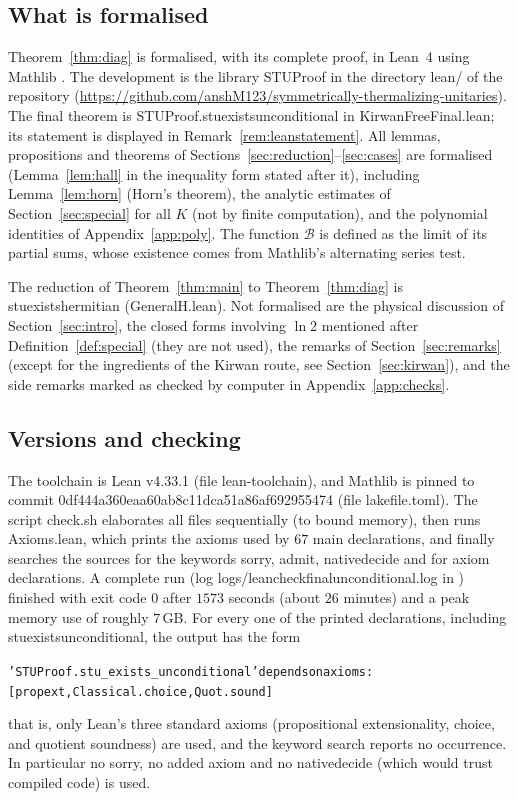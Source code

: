 \documentclass[11pt]{amsart}
\theoremstyle{definition}
\theoremstyle{remark}
\numberwithin{equation}{section}
\newcommand{\cB}{\mathcal{B}}
\newcommand{\leanus}{\textunderscore\allowbreak}
\newcommand{\lean}[1]{{\ttfamily\let\_\leanus #1}}
\begin{document}
\subsection{What is formalised}
Theorem~\ref{thm:diag} is formalised, with its complete proof, in Lean~4 \cite{deMouraUllrich2021}
using Mathlib \cite{mathlib2020}. The development is the library \lean{STUProof} in the directory
\lean{lean/} of the repository \cite{STUrepo} (\url{https://github.com/anshM123/symmetrically-thermalizing-unitaries}). The
final theorem is \lean{STUProof.stu\_exists\_unconditional} in \lean{KirwanFreeFinal.lean}; its statement
is displayed in Remark~\ref{rem:leanstatement}. All lemmas, propositions and theorems of
Sections~\ref{sec:reduction}--\ref{sec:cases} are formalised (Lemma~\ref{lem:hall} in the inequality form
stated after it), including Lemma~\ref{lem:horn} (Horn's theorem), the analytic estimates of
Section~\ref{sec:special} for all $K$ (not by finite computation), and the polynomial identities of
Appendix~\ref{app:poly}. The function $\cB$ is defined as the limit of its partial sums, whose existence
comes from Mathlib's alternating series test.

The reduction of Theorem~\ref{thm:main} to Theorem~\ref{thm:diag} is \lean{stu\_exists\_hermitian}
(\lean{GeneralH.lean}). Not formalised are the physical discussion of Section~\ref{sec:intro}, the closed
forms involving $\ln2$ mentioned after Definition~\ref{def:special} (they are not used), the remarks of
Section~\ref{sec:remarks} (except for the ingredients of the Kirwan route, see Section~\ref{sec:kirwan}),
and the side remarks marked as checked by computer in Appendix~\ref{app:checks}.

\subsection{Versions and checking}
The toolchain is Lean \lean{v4.33.1} (file \lean{lean-toolchain}), and Mathlib is pinned to commit
\lean{0df444a360eaa60ab8c11dca51a86af692955474} (file \lean{lakefile.toml}). The script
\lean{check.sh} elaborates all files sequentially (to bound memory), then runs \lean{Axioms.lean}, which
prints the axioms used by $67$ main declarations, and finally searches the sources for the keywords
\lean{sorry}, \lean{admit}, \lean{native\_decide} and for \lean{axiom} declarations. A complete run
(log \lean{logs/lean\_check\_final\_unconditional.log} in \cite{STUrepo}) finished with exit code $0$
after $1573$ seconds (about $26$ minutes) and a peak memory use of roughly $7$\,GB. For every one of the
printed declarations, including \lean{stu\_exists\_unconditional}, the output has the form
\begin{alltt}\small
'STUProof.stu_exists_unconditional' depends on axioms:
    [propext, Classical.choice, Quot.sound]
\end{alltt}
that is, only Lean's three standard axioms (propositional extensionality, choice, and quotient
soundness) are used, and the keyword search reports no occurrence. In particular no \lean{sorry}, no
added axiom and no \lean{native\_decide} (which would trust compiled code) is used.
\end{document}
